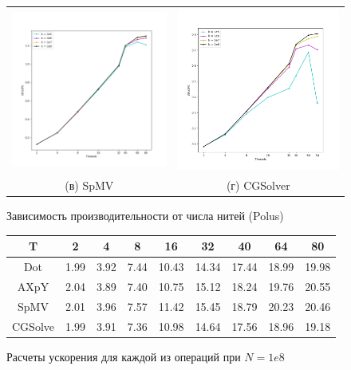 \documentclass[12pt, a4paper]{article}
\begin{document}
\begin{figure}[H]
\begin{tabular}{cc}
		\includegraphics[width=85mm]{multithread_polus_spmv} & \includegraphics[width=85mm]{multithread_polus_cgsolver} \\
		(в) SpMV & (г) CGSolver \\[6pt]
	\end{tabular}
	\caption{Зависимость производительности от числа нитей (Polus)}
	\label{fig:multithread_flops_polus} 
\end{figure}

\begin{figure}[H]
	\center
	\setlength{\tabcolsep}{10pt}
	\renewcommand{\arraystretch}{1.5}
	\begin{tabular}{|c|c|c|c|c|c|c|c|c|}
		\hline
		T & 2 & 4 & 8 & 16 & 32 & 40 & 64 & 80  \\
		\hline
		Dot & 1.99 & 3.92 & 7.44 & 10.43 & 14.34 & 17.44 & 18.99 & 19.98 \\
		\hline
		AXpY & 2.04 & 3.89 & 7.40 & 10.75 & 15.12 & 18.24 & 19.76 & 20.55  \\
		\hline
		SpMV & 2.01 & 3.96 & 7.57 & 11.42 & 15.45 & 18.79 & 20.23 & 20.46  \\
		\hline
		CGSolve & 1.99 & 3.91 & 7.36 & 10.98 & 14.64 & 17.56 & 18.96 & 19.18 \\
		\hline
	\end{tabular}
	\caption{Расчеты ускорения для каждой из операций при $N = 1e8$}
	\label{fig:speedup}
\end{figure}
\end{document}
